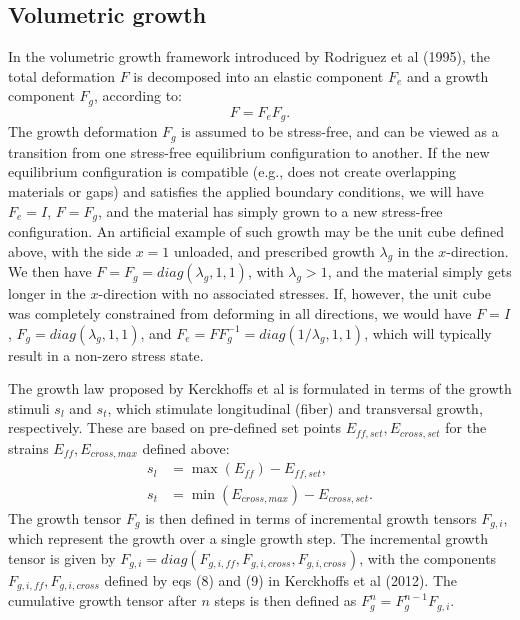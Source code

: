 \documentclass[a4paper,10pt]{article}
\begin{document}
\subsection{Volumetric growth}
In the volumetric growth framework introduced by 
Rodriguez et al (1995), the total deformation $F$ is decomposed into an elastic component $F_e$ and a growth
component $F_g$, according to:
\[
  F = F_e F_g . 
\]
The growth deformation $F_g$ is assumed to be stress-free, and can be viewed as a transition from one stress-free 
equilibrium configuration to another. If the new equilibrium configuration is compatible (e.g., does not create
overlapping materials or gaps) and satisfies the applied boundary conditions, we will have $F_e = I$, $F=F_g$, and the
material has simply grown to a new stress-free configuration. An artificial example of such growth may be the unit cube 
defined above, with the side $x=1$ unloaded, and prescribed growth $\lambda_g$ in the $x$-direction. 
We then have $F=F_g= diag(\lambda_g, 1, 1)$, with $\lambda_g > 1$, and the
material simply gets longer in the $x$-direction with no associated stresses. If, however, the unit cube was completely 
constrained from deforming in all directions, we would have $F = I$, $F_g= diag(\lambda_g, 1, 1)$, and 
$F_e = F F_g^{-1} = diag(1/\lambda_g, 1, 1)$, which will typically result in a non-zero stress state. 

The growth law proposed by Kerckhoffs et al is formulated in terms of the growth stimuli $s_l$ and $s_t$, 
which stimulate longitudinal (fiber) and transversal growth, respectively. These are based on pre-defined
set points $E_{ff,set}, E_{cross,set}$ for the strains $E_{ff}, E_{cross,max}$ defined above:
\begin{align*}
  s_l &= \max(E_{ff}) - E_{ff,set}, \\
  s_t &= \min(E_{cross,max}) - E_{cross,set} .
\end{align*}
The growth tensor $F_g$ is then defined in terms of incremental growth tensors $F_{g,i}$, which represent the
growth over a single growth step. The incremental growth tensor is given  
by $F_{g,i}= diag(F_{g,i,ff}, F_{g,i,cross}, F_{g,i,cross})$, with the components 
$F_{g,i,ff}, F_{g,i,cross}$ defined by eqs (8) and (9) in Kerckhoffs et al (2012). The cumulative growth tensor
after $n$ steps is then defined as $F_g^n = F_g^{n-1} F_{g,i}$.
\end{document}
